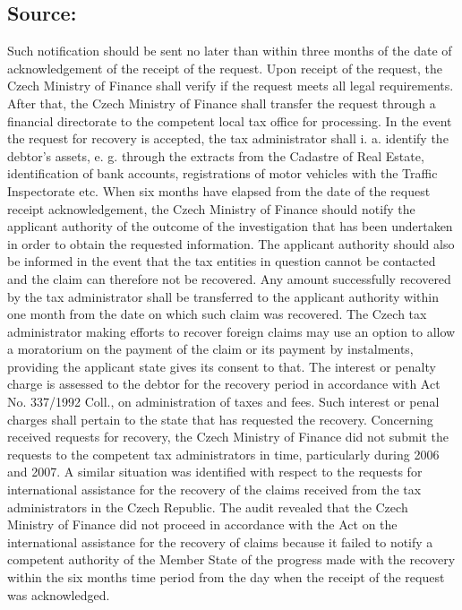 \documentclass[10pt]{article}
\begin{document}
\subsection*{Source:}

Such notification should be sent no later than within three months of the date of acknowledgement of the receipt of the request.
Upon receipt of the request, the Czech Ministry of Finance shall verify if the request meets all legal requirements. After that, the Czech Ministry of Finance shall transfer the request through a financial directorate to the competent local tax office for processing.
In the event the request for recovery is accepted, the tax administrator shall i. a. identify the debtor's assets, e. g. through the extracts from the Cadastre of Real Estate, identification of bank accounts, registrations of motor vehicles with the Traffic Inspectorate etc.
When six months have elapsed from the date of the request receipt acknowledgement, the Czech Ministry of Finance should notify the applicant authority of the outcome of the investigation that has been undertaken in order to obtain the requested information.
The applicant authority should also be informed in the event that the tax entities in question cannot be contacted and the claim can therefore not be recovered.
Any amount successfully recovered by the tax administrator shall be transferred to the applicant authority within one month from the date on which such claim was recovered.
The Czech tax administrator making efforts to recover foreign claims may use an option to allow a moratorium on the payment of the claim or its payment by instalments, providing the applicant state gives its consent to that.
The interest or penalty charge is assessed to the debtor for the recovery period in accordance with Act No. 337/1992 Coll., on administration of taxes and fees.
Such interest or penal charges shall pertain to the state that has requested the recovery.
Concerning received requests for recovery, the Czech Ministry of Finance did not submit the requests to the competent tax administrators in time, particularly during 2006 and 2007.
A similar situation was identified with respect to the requests for international assistance for the recovery of the claims received from the tax administrators in the Czech Republic.
The audit revealed that the Czech Ministry of Finance did not proceed in accordance with the Act on the international assistance for the recovery of claims because it failed to notify a competent authority of the Member State of the progress made with the recovery within the six months time period from the day when the receipt of the request was acknowledged.
\end{document}
